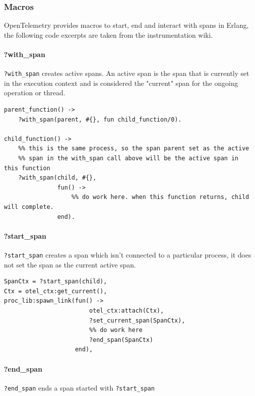     \subsubsection{Macros}
        OpenTelemetry provides macros to start, end and interact with spans in Erlang, the following code excerpts are taken from the instrumentation wiki. \cite{otel-in}
        \paragraph{?with\_span}
            \texttt{?with\_span} creates active spans. An active span is the span that is currently set in the execution context and is considered the "current" span for the ongoing operation or thread. \cite{active-s}
        \begin{verbatim}
parent_function() ->
    ?with_span(parent, #{}, fun child_function/0).

child_function() ->
    %% this is the same process, so the span parent set as the active
    %% span in the with_span call above will be the active span in this function
    ?with_span(child, #{},
               fun() ->
                   %% do work here. when this function returns, child will complete.
               end).
        \end{verbatim}
        \paragraph{?start\_span}
            \texttt{?start\_span} creates a span which isn't connected to a particular process, it does not set the span as the current active span.
        \begin{verbatim}
SpanCtx = ?start_span(child),
Ctx = otel_ctx:get_current(),
proc_lib:spawn_link(fun() ->
                        otel_ctx:attach(Ctx),
                        ?set_current_span(SpanCtx),
                        %% do work here
                        ?end_span(SpanCtx)
                    end),
        \end{verbatim}


        \paragraph{?end\_span}
            \texttt{?end\_span} ends a span started with \texttt{?start\_span}

